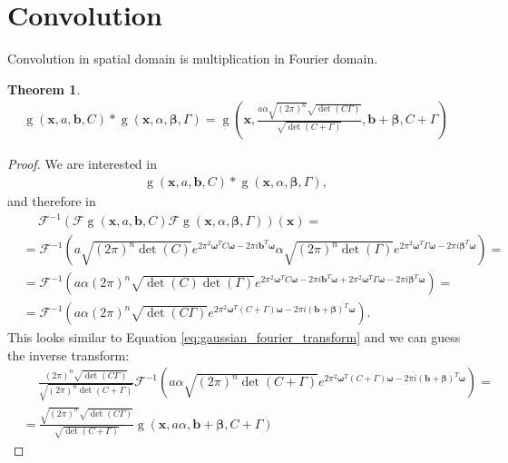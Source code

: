 \documentclass{paper}
\newtheorem{theorem}{Theorem}
\newcommand{\F}{\ensuremath{\mathcal{F}}}
\newcommand{\vr}[1]{\ensuremath{\boldsymbol{#1}}}
\newcommand{\f}[1]{\operatorname{#1}}
\newcommand{\betavec}[0]{\ensuremath{\vr{\beta{}}}}
\newcommand{\omegavec}[0]{\ensuremath{\vr{\omega{}}}}
\newcommand{\bvec}[0]{\ensuremath{\vr{b}}}
\newcommand{\xvec}[0]{\ensuremath{\vr{x}}}
\begin{document}
\section{Convolution}
Convolution in spatial domain is multiplication in Fourier domain.
\begin{theorem}
	\begin{align}
		\f{g}(\xvec, a, \bvec, C) \ast \f{g}(\xvec, \alpha, \vr{\beta}, \Gamma) = 
		\f{g}\left(\xvec, \frac{a \alpha \sqrt{(2 \pi)^n} \sqrt{\f{det}(C\Gamma)}}{\sqrt{\f{det}(C+\Gamma)}}, \bvec + \betavec, C + \Gamma\right)
	\end{align}
\end{theorem}
\begin{proof}
We are interested in
\begin{align*}
	\f{g}(\xvec, a, \bvec, C) \ast \f{g}(\xvec, \alpha, \vr{\beta}, \Gamma),
\end{align*}
and therefore in
\begin{align*}
	&\ \quad \F^{-1}(\F\f{g}(\xvec, a, \bvec, C) \F\f{g}(\xvec, \alpha, \vr{\beta}, \Gamma))(\xvec) = \nonumber \\
	&= \F^{-1}\left(a \sqrt{(2 \pi)^n \f{det}(C)}      e^{2 \pi^2 \omegavec^T C \omegavec      - 2\pi i \bvec^T \omegavec}
	         \alpha \sqrt{(2 \pi)^n \f{det}(\Gamma)} e^{2 \pi^2 \omegavec^T \Gamma \omegavec - 2\pi i \betavec^T \omegavec}\right) = \nonumber \\
	&= \F^{-1}\left(a \alpha (2 \pi)^n \sqrt{\f{det}(C) \f{det}(\Gamma)}
			        e^{2 \pi^2 \omegavec^T C \omegavec - 2\pi i \bvec^T \omegavec + 2 \pi^2 \omegavec^T \Gamma \omegavec - 2\pi i \betavec^T \omegavec}\right) = \nonumber \\
	\label{eq:gaussian_convolution_before_inverse_transform}
	&= \F^{-1}\left(a \alpha (2 \pi)^n \sqrt{\f{det}(C\Gamma)}
                    e^{2 \pi^2 \omegavec^T (C + \Gamma) \omegavec - 2\pi i (\bvec + \betavec)^T \omegavec}\right).
\end{align*}
This looks similar to Equation \ref{eq:gaussian_fourier_transform} and we can guess the inverse transform:
\begin{align*}
	&\ \quad \frac{(2 \pi)^n \sqrt{\f{det}(C\Gamma)}}{\sqrt{(2\pi)^n \f{det}(C+\Gamma)}}
	        \F^{-1}\left(
	                     a \alpha \sqrt{(2\pi)^n \f{det}(C+\Gamma)}
	                     e^{2 \pi^2 \omegavec^T (C + \Gamma) \omegavec - 2\pi i (\bvec + \betavec)^T \omegavec}\right) = \\
	&= \frac{\sqrt{(2 \pi)^n} \sqrt{\f{det}(C\Gamma)}}{\sqrt{\f{det}(C+\Gamma)}}
	   \f{g}(\xvec, a \alpha, \bvec + \betavec, C + \Gamma)
\end{align*}
\end{proof}
\end{document}
